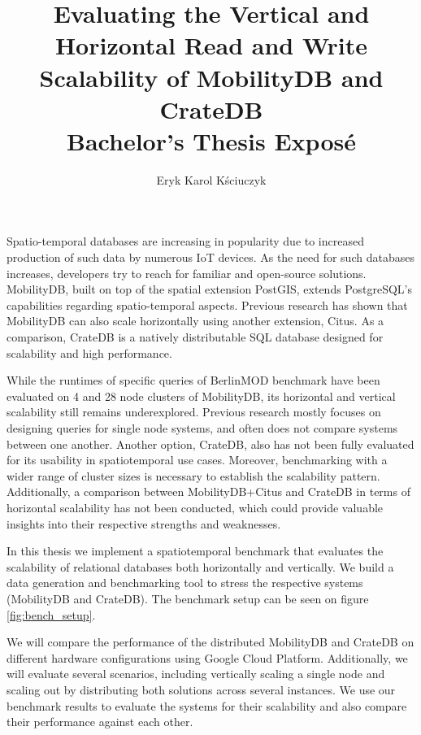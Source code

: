 \documentclass{article}
\title{
	Evaluating the Vertical and Horizontal Read and Write Scalability of 
	MobilityDB and CrateDB
	\\[1ex] \large Bachelor's Thesis Exposé}
\author{Eryk Karol Kściuczyk}
\date{} %
\begin{document}
\maketitle

Spatio-temporal databases are increasing in popularity due to increased
production of such data by numerous IoT devices.
As the need for such databases increases, developers try to reach for 
familiar and open-source solutions.
MobilityDB, built on top of the spatial extension PostGIS, extends PostgreSQL's 
capabilities regarding spatio-temporal aspects.
Previous research has shown that MobilityDB can also scale horizontally using
another extension, Citus.
As a comparison, CrateDB is a natively distributable SQL database designed for
scalability and high performance.

While the runtimes of specific queries of BerlinMOD benchmark have been 
evaluated on 4 and 28 node clusters of MobilityDB,
its horizontal and vertical scalability still remains underexplored.
Previous research mostly focuses on designing queries for single node systems,
and often does not compare systems between one another. 
Another option, CrateDB, also has not been fully evaluated for its usability 
in spatiotemporal use cases.
Moreover, benchmarking with a wider range of cluster sizes is necessary to 
establish the scalability pattern.
Additionally, a comparison between MobilityDB+Citus and CrateDB in terms of
horizontal scalability has not been conducted, which could provide valuable
insights into their respective strengths and weaknesses.

In this thesis we implement a spatiotemporal benchmark that evaluates the
scalability of relational databases both horizontally and vertically.
We build a data generation and benchmarking tool to stress the respective 
systems (MobilityDB and CrateDB). The benchmark setup can be seen on figure 
\ref{fig:bench_setup}.

We will compare the performance of the distributed MobilityDB and 
CrateDB on different hardware configurations using Google Cloud Platform.
Additionally, we will evaluate several scenarios, including vertically scaling 
a single node and scaling out by distributing both solutions across several
instances. 
We use our benchmark results to evaluate the systems for their scalability
and also compare their performance against each other.
\end{document}
